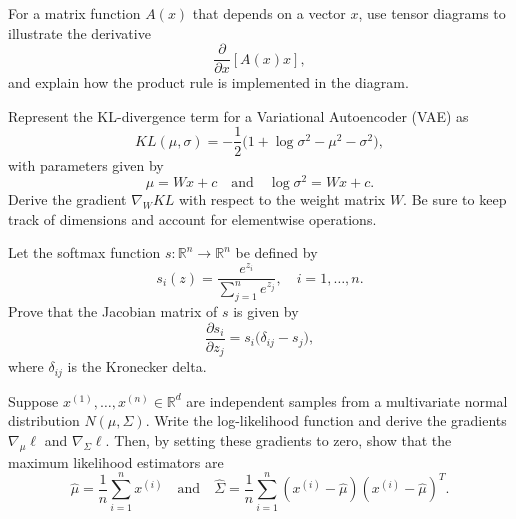 \begin{exercise}
   For a matrix function $A(x)$ that depends on a vector $x$, use tensor diagrams to illustrate the derivative 
   \[
      \frac{\partial}{\partial x}[A(x)x],
   \]
   and explain how the product rule is implemented in the diagram.
\end{exercise}

\begin{exercise}
   Represent the KL-divergence term for a Variational Autoencoder (VAE) as
   \[
      KL(\mu,\sigma) = -\frac{1}{2}\Big(1 + \log\sigma^2 - \mu^2 - \sigma^2\Big),
   \]
   with parameters given by 
   \[
      \mu = W x + c \quad \text{and} \quad \log\sigma^2 = W x + c.
   \]
   Derive the gradient $\nabla_W KL$ with respect to the weight matrix $W$. Be sure to keep track of dimensions and account for elementwise operations.
\end{exercise}
\begin{exercise}
   Let the softmax function $s:\mathbb{R}^n \to \mathbb{R}^n$ be defined by
   \[
      s_i(z) = \frac{e^{z_i}}{\sum_{j=1}^n e^{z_j}}, \quad i=1,\dots,n.
   \]
   Prove that the Jacobian matrix of $s$ is given by
   \[
      \frac{\partial s_i}{\partial z_j} = s_i\big(\delta_{ij} - s_j\big),
   \]
   where $\delta_{ij}$ is the Kronecker delta.
\end{exercise}

\begin{exercise}
   Suppose $x^{(1)},\dots,x^{(n)} \in \mathbb{R}^d$ are independent samples from a multivariate normal distribution $N(\mu,\Sigma)$. Write the log-likelihood function and derive the gradients $\nabla_\mu \ell$ and $\nabla_\Sigma \ell$. Then, by setting these gradients to zero, show that the maximum likelihood estimators are
   \[
      \hat\mu = \frac{1}{n}\sum_{i=1}^n x^{(i)} \quad \text{and} \quad \hat\Sigma = \frac{1}{n}\sum_{i=1}^n (x^{(i)} - \hat\mu)(x^{(i)} - \hat\mu)^T.
   \]
\end{exercise}

